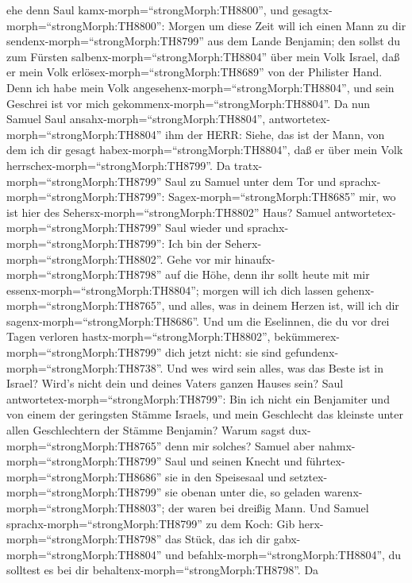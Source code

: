 ehe denn Saul kamx-morph=``strongMorph:TH8800'', und
gesagtx-morph=``strongMorph:TH8800'':  Morgen um diese Zeit
will ich einen Mann zu dir sendenx-morph=``strongMorph:TH8799'' aus dem
Lande Benjamin; den sollst du zum Fürsten
salbenx-morph=``strongMorph:TH8804'' über mein Volk Israel, daß er mein
Volk erlösex-morph=``strongMorph:TH8689'' von der Philister Hand. Denn
ich habe mein Volk angesehenx-morph=``strongMorph:TH8804'', und sein
Geschrei ist vor mich gekommenx-morph=``strongMorph:TH8804''.
 Da nun Samuel Saul ansahx-morph=``strongMorph:TH8804'',
antwortetex-morph=``strongMorph:TH8804'' ihm der HERR: Siehe, das ist
der Mann, von dem ich dir gesagt habex-morph=``strongMorph:TH8804'', daß
er über mein Volk herrschex-morph=``strongMorph:TH8799''. 
Da tratx-morph=``strongMorph:TH8799'' Saul zu Samuel unter dem Tor und
sprachx-morph=``strongMorph:TH8799'': Sagex-morph=``strongMorph:TH8685''
mir, wo ist hier des Sehersx-morph=``strongMorph:TH8802'' Haus?
 Samuel antwortetex-morph=``strongMorph:TH8799'' Saul
wieder und sprachx-morph=``strongMorph:TH8799'': Ich bin der
Seherx-morph=``strongMorph:TH8802''. Gehe vor mir
hinaufx-morph=``strongMorph:TH8798'' auf die Höhe, denn ihr sollt heute
mit mir essenx-morph=``strongMorph:TH8804''; morgen will ich dich lassen
gehenx-morph=``strongMorph:TH8765'', und alles, was in deinem Herzen
ist, will ich dir sagenx-morph=``strongMorph:TH8686''.  Und
um die Eselinnen, die du vor drei Tagen verloren
hastx-morph=``strongMorph:TH8802'',
bekümmerex-morph=``strongMorph:TH8799'' dich jetzt nicht: sie sind
gefundenx-morph=``strongMorph:TH8738''. Und wes wird sein alles, was das
Beste ist in Israel? Wird's nicht dein und deines Vaters ganzen Hauses
sein?  Saul antwortetex-morph=``strongMorph:TH8799'': Bin
ich nicht ein Benjamiter und von einem der geringsten Stämme Israels,
und mein Geschlecht das kleinste unter allen Geschlechtern der Stämme
Benjamin? Warum sagst dux-morph=``strongMorph:TH8765'' denn mir solches?
 Samuel aber nahmx-morph=``strongMorph:TH8799'' Saul und
seinen Knecht und führtex-morph=``strongMorph:TH8686'' sie in den
Speisesaal und setztex-morph=``strongMorph:TH8799'' sie obenan unter
die, so geladen warenx-morph=``strongMorph:TH8803''; der waren bei
dreißig Mann.  Und Samuel
sprachx-morph=``strongMorph:TH8799'' zu dem Koch: Gib
herx-morph=``strongMorph:TH8798'' das Stück, das ich dir
gabx-morph=``strongMorph:TH8804'' und
befahlx-morph=``strongMorph:TH8804'', du solltest es bei dir
behaltenx-morph=``strongMorph:TH8798''.  Da
